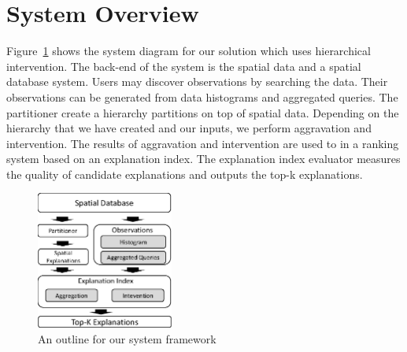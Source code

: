 \section{System Overview}

Figure~\ref{fig:framework} shows the system diagram for our solution which uses hierarchical intervention. 
The back-end of the system is the spatial data and a spatial database system. 
Users may discover observations by searching the data. Their observations can be generated from data histograms and aggregated queries.
The partitioner create a hierarchy partitions on top of spatial data. Depending on the hierarchy that we have created and our inputs, we perform aggravation and intervention. The results of aggravation and intervention are used to in a ranking system based on an explanation index. The explanation index evaluator measures the quality of candidate explanations and outputs the top-k explanations. 

\begin{figure}[t]
	\centering
		\includegraphics[width=0.4\textwidth]{images/architecture.eps}
		\caption{An outline for our system framework}
	\label{fig:framework}
\end{figure}

